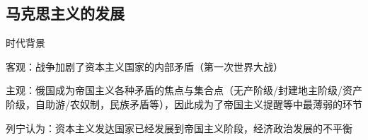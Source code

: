 \subsection{马克思主义的发展}%
\label{sub:马克思主义的发展}
\begin{notation}
    时代背景

    客观：战争加剧了资本主义国家的内部矛盾（第一次世界大战）

    主观：俄国成为帝国主义各种矛盾的焦点与集合点（无产阶级/封建地主阶级/资产阶级，自助游/农奴制，民族矛盾等），因此成为了帝国主义提醒等中最薄弱的环节
\end{notation}
列宁认为：资本主义发达国家已经发展到帝国主义阶段，经济政治发展的不平衡












